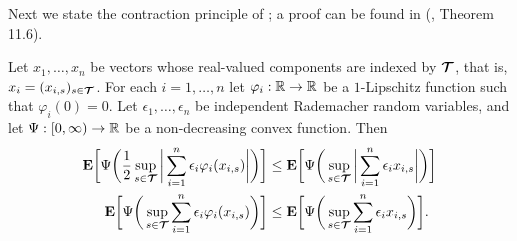 Next we state the contraction principle of \citep{LedouxTal:91}; a proof can be found in
(\cite{boucheron2013concentration}, Theorem 11.6).
\begin{theorem}
	Let $x_1,\dots,x_n$ be vectors whose real-valued components are indexed by $\boldsymbol{\mathcal T}$,
	that is, $x_i=(x_{i,s})_{s\in\boldsymbol{\mathcal T}}$. For each $i=1,\dots,n$ let $\varphi_i:{\mathbb R}\rightarrow{\mathbb R}$
	be a $1$-Lipschitz function such that $\varphi_i(0)=0$. Let $\epsilon_1,\dots,\epsilon_n$ be
	independent Rademacher random variables, and let $\Psi:[0,\infty) \rightarrow {\mathbb R}$ be a
	non-decreasing convex function. Then
	\begin{align}
	\mathbf E \bigg[\Psi\bigg(\frac{1}{2}\sup_{s\in\boldsymbol{\mathcal T}}\bigg|\sum_{i=1}^n\epsilon_i\varphi_i(x_{i,s})\bigg| \bigg) \bigg]
	&\leq
	\mathbf E \bigg[\Psi\bigg(\sup_{s\in\boldsymbol{\mathcal T}}\bigg|\sum_{i=1}^n\epsilon_i x_{i,s}\bigg| \bigg) \bigg]\\
	\mathbf E \bigg[\Psi\bigg(\sup_{s\in\boldsymbol{\mathcal T}}\sum_{i=1}^n\epsilon_i\varphi_i(x_{i,s})\bigg) \bigg]
	&\leq  \mathbf E \bigg[\Psi\bigg(\sup_{s\in\boldsymbol{\mathcal T}}\sum_{i=1}^n\epsilon_i x_{i,s} \bigg) \bigg] .
	\end{align}
\end{theorem}
